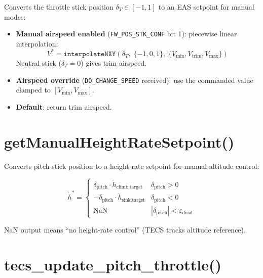 \documentclass[12pt,a4paper]{article}
\begin{document}
Converts the throttle stick position $\delta_T \in [-1, 1]$ to an EAS
setpoint for manual modes:

\begin{itemize}
  \item \textbf{Manual airspeed enabled} (\texttt{FW\_POS\_STK\_CONF} bit 1):
        piecewise linear interpolation:
        \begin{equation}
          V^* = \texttt{interpolateNXY}\!\left(\delta_T,\;
            \{-1, 0, 1\},\;\{V_{\min}, V_{\text{trim}}, V_{\max}\}\right)
        \end{equation}
        Neutral stick ($\delta_T = 0$) gives trim airspeed.

  \item \textbf{Airspeed override} (\texttt{DO\_CHANGE\_SPEED} received):
        use the commanded value clamped to $[V_{\min}, V_{\max}]$.

  \item \textbf{Default}: return trim airspeed.
\end{itemize}

\section{getManualHeightRateSetpoint()}

Converts pitch-stick position to a height rate setpoint for manual altitude
control:

\begin{equation}
  \dot{h}^* = \begin{cases}
    \delta_{\text{pitch}} \cdot \dot{h}_{\text{climb,target}} & \delta_{\text{pitch}} > 0 \\
    -\delta_{\text{pitch}} \cdot \dot{h}_{\text{sink,target}} & \delta_{\text{pitch}} < 0 \\
    \text{NaN} & |\delta_{\text{pitch}}| < \varepsilon_{\text{dead}}
  \end{cases}
\end{equation}

NaN output means ``no height-rate control'' (TECS tracks altitude reference).

\section{tecs\_update\_pitch\_throttle()}
\end{document}
